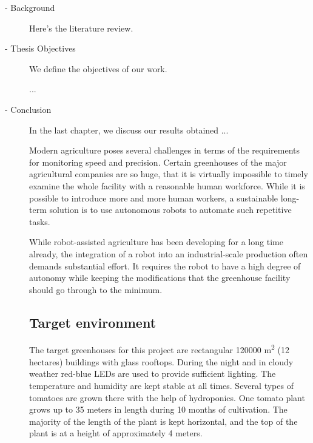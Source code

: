 \begin{description}
    \item[ - Background]
Here's the literature review.

    \item[ - Thesis Objectives]
We define the objectives of our work.

...

    \item[ - Conclusion]
In the last chapter, we discuss our results obtained ...




Modern agriculture poses several challenges in terms of the requirements for monitoring speed and precision.
Certain greenhouses of the major agricultural companies are so huge, that it is virtually impossible to timely examine the whole facility with a reasonable human workforce.
While it is possible to introduce more and more human workers, a sustainable long-term solution is to use autonomous robots to automate such repetitive tasks.

While robot-assisted agriculture has been developing for a long time already, the integration of a robot into an industrial-scale production often demands substantial effort.
It requires the robot to have a high degree of autonomy while keeping the modifications that the greenhouse facility should go through to the minimum.
\subsection{Target environment}
The target greenhouses for this project are rectangular 120000 \si{m^2} (12 hectares) buildings with glass rooftops.
During the night and in cloudy weather red-blue LEDs are used to provide sufficient lighting.
The temperature and humidity are kept stable at all times. Several types of tomatoes are grown there with the help of hydroponics. One tomato plant grows up to 35 meters in length during 10 months of cultivation.
The majority of the length of the plant is kept horizontal, and the top of the plant is at a height of approximately 4 meters.

\end{description}
